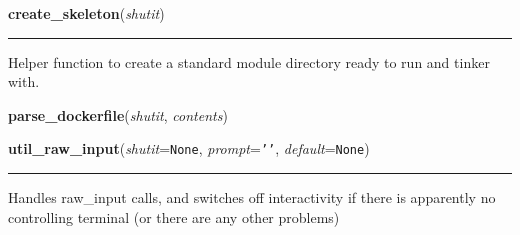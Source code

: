     \label{util:create_skeleton}

    \vspace{0.5ex}

\hspace{.8\funcindent}\begin{boxedminipage}{\funcwidth}

    \raggedright \textbf{create\_skeleton}(\textit{shutit})

    \vspace{-1.5ex}

    \rule{\textwidth}{0.5\fboxrule}
\setlength{\parskip}{2ex}
    Helper function to create a standard module directory ready to run and 
    tinker with.

\setlength{\parskip}{1ex}
    \end{boxedminipage}

    \label{util:parse_dockerfile}

    \vspace{0.5ex}

\hspace{.8\funcindent}\begin{boxedminipage}{\funcwidth}

    \raggedright \textbf{parse\_dockerfile}(\textit{shutit}, \textit{contents})

\setlength{\parskip}{2ex}
\setlength{\parskip}{1ex}
    \end{boxedminipage}

    \label{util:util_raw_input}

    \vspace{0.5ex}

\hspace{.8\funcindent}\begin{boxedminipage}{\funcwidth}

    \raggedright \textbf{util\_raw\_input}(\textit{shutit}={\tt None}, \textit{prompt}={\tt \texttt{'}\texttt{}\texttt{'}}, \textit{default}={\tt None})

    \vspace{-1.5ex}

    \rule{\textwidth}{0.5\fboxrule}
\setlength{\parskip}{2ex}
    Handles raw\_input calls, and switches off interactivity if there is 
    apparently no controlling terminal (or there are any other problems)

\setlength{\parskip}{1ex}
    \end{boxedminipage}

